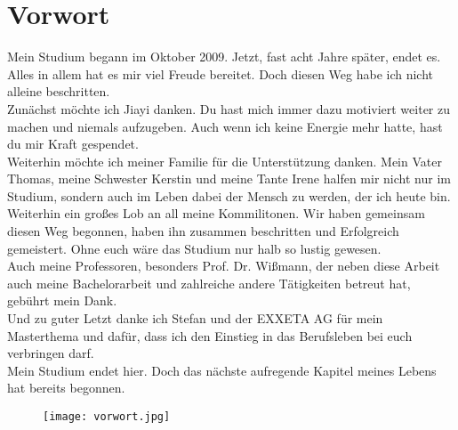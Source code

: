\chapter*{Vorwort}

Mein Studium begann im Oktober 2009. Jetzt, fast acht Jahre später, endet es. Alles in allem hat es mir viel Freude bereitet. Doch diesen Weg habe ich nicht alleine beschritten. \\
Zunächst möchte ich Jiayi danken. Du hast mich immer dazu motiviert weiter zu machen und niemals aufzugeben. Auch wenn ich keine Energie mehr hatte, hast du mir Kraft gespendet. \\
Weiterhin möchte ich meiner Familie für die Unterstützung danken. Mein Vater Thomas, meine Schwester Kerstin und meine Tante Irene halfen mir nicht nur im Studium, sondern auch im Leben dabei der Mensch zu werden, der ich heute bin. \\
Weiterhin ein großes Lob an all meine Kommilitonen. Wir haben gemeinsam diesen Weg begonnen, haben ihn zusammen beschritten und Erfolgreich gemeistert. Ohne euch wäre das Studium nur halb so lustig gewesen.\\
Auch meine Professoren, besonders Prof. Dr. Wißmann, der neben diese Arbeit auch meine Bachelorarbeit und zahlreiche andere Tätigkeiten betreut hat, gebührt mein Dank.\\
Und zu guter Letzt danke ich Stefan und der EXXETA AG für mein Masterthema und dafür, dass ich den Einstieg in das Berufsleben bei euch verbringen darf.\\
Mein Studium endet hier. Doch das nächste aufregende Kapitel meines Lebens hat bereits begonnen. 

\begin{figure}[H]
	\begin{center}
		\texttt{[image: vorwort.jpg]}
	\end{center}
\end{figure}
